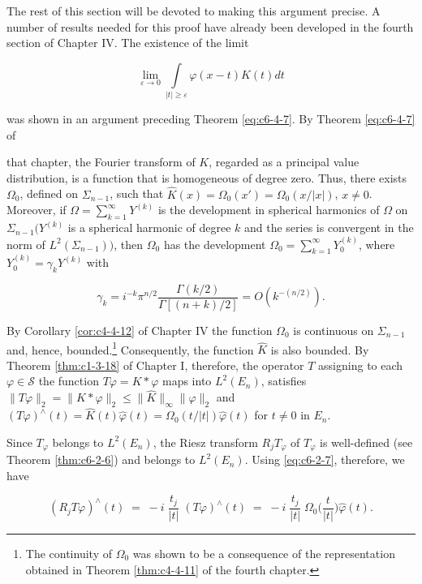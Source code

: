 The rest of this section will be devoted to making this argument precise. A number of results needed for this proof have already been developed in the fourth section of Chapter IV. The existence of the limit

\[
\lim_{\varepsilon\to0}\int\limits_{|t|\ge\varepsilon}\varphi(x-t)K(t)dt
\]

was shown in an argument preceding Theorem \ref{eq:c6-4-7}. By Theorem \ref{eq:c6-4-7} of

that chapter, the Fourier transform of $K$, regarded as a principal value distribution, is a function that is homogeneous of degree zero. Thus, there exists $\Omega_0$, defined on $\Sigma_{n-1}$, such that $\hat{K}(x) = \Omega_0(x') = \Omega_0(x/|x|)$, $x \neq 0$. Moreover, if $\Omega = \sum_{k=1}^{\infty} Y^{(k)}$ is the development in spherical harmonics of $\Omega$ on $\Sigma_{n-1}(Y^{(k)}$ is a spherical harmonic of degree $k$ and the series is convergent in the norm of $L^2(\Sigma_{n-1}))$, then $\Omega_0$ has the development $\Omega_0 = \sum_{k=1}^{\infty} Y_0^{(k)}$, where $Y_0^{(k)} = \gamma_k Y^{(k)}$ with

\begin{equation}\label{eq:c6-3-2}
\gamma_{k}=i^{-k}\pi^{n/2}\frac{\Gamma(k/2)}{\Gamma[(n+k)/2]}=O(k^{-(n/2)}).
\end{equation}

By Corollary \ref{cor:c4-4-12} of Chapter IV the function $\Omega_0$ is continuous on $\Sigma_{n-1}$ and, hence, bounded.\footnote{The continuity of $\Omega_{0}$ was shown to be a consequence of the representation obtained in Theorem \ref{thm:c4-4-11} of the fourth chapter.} Consequently, the function $\hat{K}$ is also bounded. By Theorem \ref{thm:c1-3-18} of Chapter I, therefore, the operator $T$ assigning to each $\varphi \in \mathcal{S}$ the function $T\varphi = K*\varphi$ maps into $L^2(E_n)$, satisfies $\|T\varphi\|_2 = \|K*\varphi\|_2 \leq \|\hat{K}\|_{\infty}\|\varphi\|_2$ and $(T\varphi)^\wedge(t) = \hat{K}(t)\hat{\varphi}(t) = \Omega_0(t/|t|)\hat{\varphi}(t)$ for $t \neq 0$ in $E_n$.

Since $T_{\varphi}$ belongs to $L^{2}(E_{n})$, the Riesz transform $R_{j}T_{\varphi}$ of $T_{\varphi}$ is well-defined (see Theorem \ref{thm:c6-2-6}) and belongs to $L^{2}(E_{n})$. Using \eqref{eq:c6-2-7}, therefore, we have

\begin{equation}\label{eq:c6-3-3}
(R_{j}T\varphi)^{\wedge}(t)\;=\;-i\;\frac{t_{j}}{|t|}\;{(T\varphi)^{\wedge}(t)}\;=\;-i\;\frac{t_{j}}{|t|}\;\Omega_{0}\biggl(\frac{t}{|t|}\biggr)\hat{\varphi}(t).
\end{equation}

